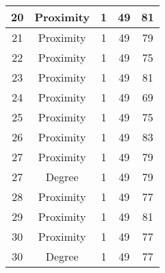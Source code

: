 \documentclass[results.tex]{subfiles}
\begin{document}
\begin{center}
\begin{tabular}{| c || c | c | c | c |}
            \hline
            20                      & Proximity                    & 1                      & 49                      & 81                   \\
            \hline
            21                      & Proximity                    & 1                      & 49                      & 79                   \\
            \hline
            22                      & Proximity                    & 1                      & 49                      & 75                   \\
            \hline
            23                      & Proximity                    & 1                      & 49                      & 81                   \\
            \hline
            24                      & Proximity                    & 1                      & 49                      & 69                   \\
            \hline
            25                      & Proximity                    & 1                      & 49                      & 75                   \\
            \hline
            26                      & Proximity                    & 1                      & 49                      & 83                   \\
            \hline
            27                      & Proximity                    & 1                      & 49                      & 79                   \\
            \hline
            27                      & Degree                       & 1                      & 49                      & 79                   \\
            \hline
            28                      & Proximity                    & 1                      & 49                      & 77                   \\
            \hline
            29                      & Proximity                    & 1                      & 49                      & 81                   \\
            \hline
            30                      & Proximity                    & 1                      & 49                      & 77                   \\
            \hline
            30                      & Degree                       & 1                      & 49                      & 77                   \\

\end{tabular}
\end{center}
\end{document}
